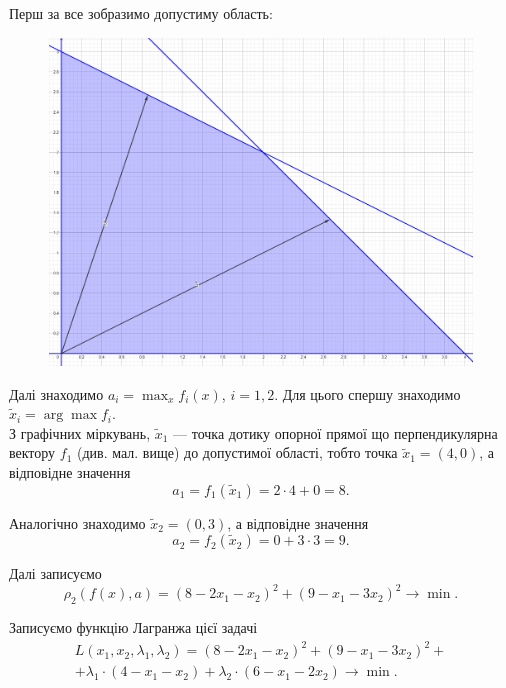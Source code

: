 \begin{solution}
    Перш за все зобразимо допустиму область:
    \begin{figure}[H]
        \centering
        \includegraphics[width=\textwidth]{ideal_point_2.png}
    \end{figure}
    
    Далі знаходимо $a_i = \max_x f_i(x)$, $i = 1, 2$. Для цього спершу знаходимо $\tilde x_i = \arg \max f_i$. \\
    
    З графічних міркувань, $\tilde x_1$ --- точка дотику опорної прямої що перпендикулярна вектору $f_1$ (див. мал. вище) до допустимої області, тобто точка $\tilde x_1 = \left( 4, 0 \right)$, а відповідне значення \[ a_1 = f_1(\tilde x_1) = 2 \cdot 4 + 0 = 8. \]
    
    Аналогічно знаходимо $\tilde x_2 = \left( 0, 3 \right)$, а відповідне значення \[ a_2 = f_2(\tilde x_2) = 0 + 3 \cdot 3 = 9. \]
    
    Далі записуємо \[ \rho_2(f(x), a) = \left( 8 - 2 x_1 - x_2 \right)^2 + \left( 9 - x_1 - 3 x_2 \right)^2 \to \min. \]
    
    Записуємо функцію Лагранжа цієї задачі 
    \begin{multline*} 
        L(x_1, x_2, \lambda_1, \lambda_2) = \left( 8 - 2 x_1 - x_2 \right)^2 + \left( 9 - x_1 - 3 x_2 \right)^2 + \\ 
        + \lambda_1 \cdot (4 - x_1 - x_2) + \lambda_2 \cdot (6 - x_1 - 2 x_2) \to \min.
    \end{multline*}
    

\end{solution}
